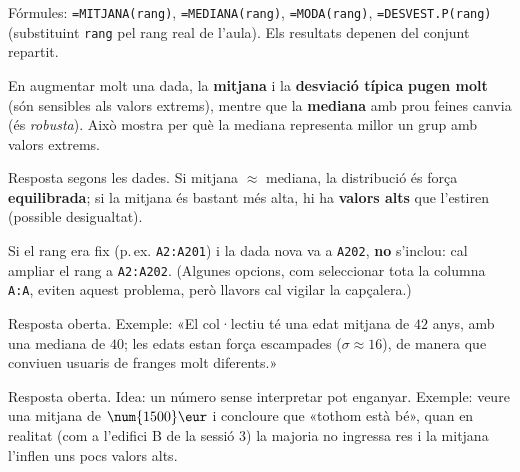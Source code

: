 \begin{solucions}
\begin{sollist}
  \item Fórmules: \texttt{=MITJANA(rang)}, \texttt{=MEDIANA(rang)},
        \texttt{=MODA(rang)}, \texttt{=DESVEST.P(rang)} (substituint \texttt{rang} pel
        rang real de l'aula). Els resultats depenen del conjunt repartit.
  \item En augmentar molt una dada, la \textbf{mitjana} i la \textbf{desviació típica}
        \textbf{pugen molt} (són sensibles als valors extrems), mentre que la
        \textbf{mediana} amb prou feines canvia (és \emph{robusta}). Això mostra per
        què la mediana representa millor un grup amb valors extrems.
  \item Resposta segons les dades. Si mitjana $\approx$ mediana, la distribució és
        força \textbf{equilibrada}; si la mitjana és bastant més alta, hi ha
        \textbf{valors alts} que l'estiren (possible desigualtat).
  \item Si el rang era fix (p.\,ex. \texttt{A2:A201}) i la dada nova va a \texttt{A202},
        \textbf{no} s'inclou: cal ampliar el rang a \texttt{A2:A202}. (Algunes opcions,
        com seleccionar tota la columna \texttt{A:A}, eviten aquest problema, però
        llavors cal vigilar la capçalera.)
  \item Resposta oberta. Exemple: «El col·lectiu té una edat mitjana de $42$ anys, amb
        una mediana de $40$; les edats estan força escampades ($\sigma\approx 16$), de
        manera que conviuen usuaris de franges molt diferents.»
  \item Resposta oberta. Idea: un número sense interpretar pot enganyar. Exemple:
        veure una mitjana de $\num{1500}\eur$ i concloure que «tothom està bé», quan
        en realitat (com a l'edifici B de la sessió 3) la majoria no ingressa res i la
        mitjana l'inflen uns pocs valors alts.
\end{sollist}
\end{solucions}
